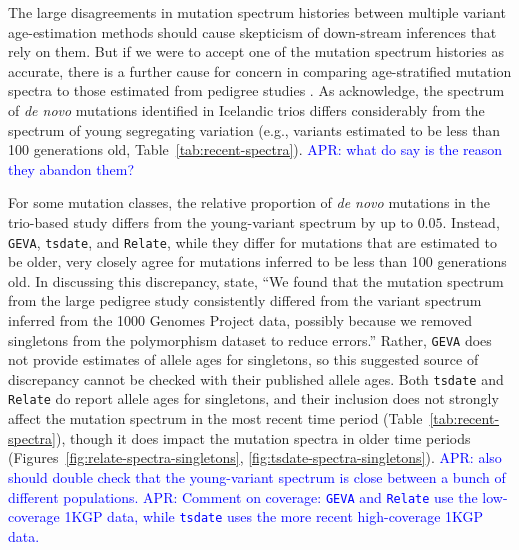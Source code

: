 \documentclass[]{article}
\newcommand{\aprcomment}[1]{{\textcolor{blue}{APR: #1}}}
\newcommand{\GEVA}{\texttt{GEVA}\xspace}
\newcommand{\tsdate}{\texttt{tsdate}\xspace}
\newcommand{\relate}{\texttt{Relate}\xspace}
\begin{document}
The large disagreements in mutation spectrum histories between multiple variant
age-estimation methods should cause skepticism of down-stream inferences that
rely on them. But if we were to accept one of the mutation spectrum histories
as accurate, there is a further cause for concern in comparing age-stratified
mutation spectra to those estimated from pedigree studies
\citep{jonsson2017parental,halldorsson2019characterizing}. As
\citet{wang2023human} acknowledge, the spectrum of \emph{de novo} mutations
identified in Icelandic trios \citep{jonsson2017parental} differs considerably
from the spectrum of young segregating variation (e.g., variants estimated to
be less than 100 generations old, Table~\ref{tab:recent-spectra}).
\aprcomment{what do \citet{gao2022limited} say is the reason they abandon
them?}

For some mutation classes, the relative proportion of \emph{de novo} mutations
in the trio-based study differs from the young-variant spectrum by up to
$0.05$. Instead, \GEVA, \tsdate, and \relate, while they differ for mutations
that are estimated to be older, very closely agree for mutations inferred to be
less than 100 generations old. In discussing this discrepancy,
\citet{wang2023human} state, ``We found that the mutation spectrum from the
large pedigree study consistently differed from the variant spectrum inferred
from the 1000 Genomes Project data, possibly because we removed singletons from
the polymorphism dataset to reduce errors.'' Rather, \GEVA does not provide
estimates of allele ages for singletons, so this suggested source of
discrepancy cannot be checked with their published allele ages. Both \tsdate
and \relate do report allele ages for singletons, and their inclusion does not
strongly affect the mutation spectrum in the most recent time period
(Table~\ref{tab:recent-spectra}), though it does impact the mutation spectra in
older time periods (Figures~\ref{fig:relate-spectra-singletons},
\ref{fig:tsdate-spectra-singletons}). \aprcomment{also should double check that
the young-variant spectrum is close between a bunch of different populations.}
\aprcomment{Comment on coverage: \GEVA and \relate use the low-coverage 1KGP
data, while \tsdate uses the more recent high-coverage 1KGP data.}
\end{document}

